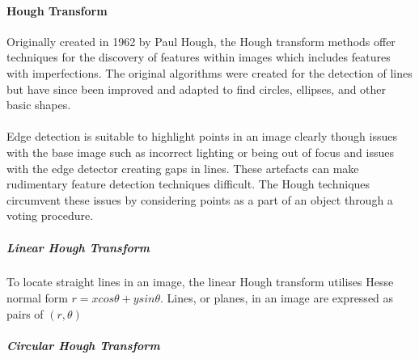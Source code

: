 	\paragraph{Hough Transform}
	Originally created in 1962 by Paul Hough, the Hough transform methods offer techniques for the discovery of features within images which includes features with imperfections. The original algorithms were created for the detection of lines but have since been improved and adapted to find circles, ellipses, and other basic shapes.
	\\\\
	Edge detection is suitable to highlight points in an image clearly though issues with the base image such as incorrect lighting or being out of focus and issues with the edge detector creating gaps in lines. These artefacts can make rudimentary feature detection techniques difficult. The Hough techniques circumvent these issues by considering points as a part of an object through a voting procedure.
	\subparagraph{Linear Hough Transform}
	To locate straight lines in an image, the linear Hough transform utilises Hesse normal form $r = x cos \theta + y sin \theta$. Lines, or planes, in an image are expressed as pairs of $(r, \theta)$ 
	\subparagraph{Circular Hough Transform}

